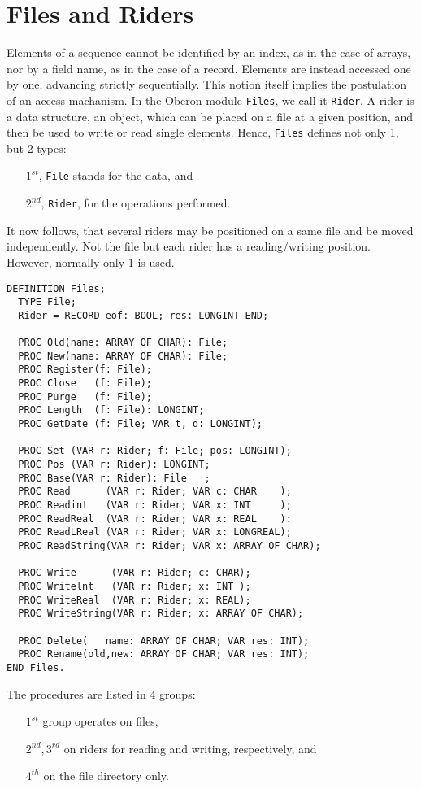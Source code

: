 \section{Files and Riders}
Elements of a sequence cannot be identified by an index, as in the case of arrays, nor by
a field name, as in the case of a record. Elements are instead accessed one by one,
advancing strictly sequentially. This notion itself implies the postulation of an access
machanism. In the Oberon module \verb|Files|, we call it \verb|Rider|. A rider is a data
structure, an object, which can be placed on a file at a given position, and then be used
to write or read single elements. Hence, \verb|Files| defines not only 1, but 2 types:
\begin{itemize}
  \item[$1^{st}$,] \verb|File| stands for the data, and
  \item[$2^{nd}$,] \verb|Rider|, for the operations performed.
\end{itemize}
It now follows, that several riders may be positioned on a same file and be moved independently.
Not the file but each rider has a reading/writing position. However, normally only 1 is used.
\begin{verbatim}
DEFINITION Files;
  TYPE File;
  Rider = RECORD eof: BOOL; res: LONGINT END;

  PROC Old(name: ARRAY OF CHAR): File;
  PROC New(name: ARRAY OF CHAR): File;
  PROC Register(f: File);
  PROC Close   (f: File);
  PROC Purge   (f: File);
  PROC Length  (f: File): LONGINT;
  PROC GetDate (f: File; VAR t, d: LONGINT);

  PROC Set (VAR r: Rider; f: File; pos: LONGINT);
  PROC Pos (VAR r: Rider): LONGINT;
  PROC Base(VAR r: Rider): File   ;
  PROC Read      (VAR r: Rider; VAR c: CHAR    );
  PROC Readint   (VAR r: Rider; VAR x: INT     );
  PROC ReadReal  (VAR r: Rider; VAR x: REAL    ):
  PROC ReadLReal (VAR r: Rider; VAR x: LONGREAL);
  PROC ReadString(VAR r: Rider; VAR x: ARRAY OF CHAR);

  PROC Write      (VAR r: Rider; c: CHAR);
  PROC Writelnt   (VAR r: Rider; x: INT );
  PROC WriteReal  (VAR r: Rider; x: REAL);
  PROC WriteString(VAR r: Rider; x: ARRAY OF CHAR);

  PROC Delete(   name: ARRAY OF CHAR; VAR res: INT);
  PROC Rename(old,new: ARRAY OF CHAR; VAR res: INT);
END Files.
\end{verbatim}
The procedures are listed in 4 groups:
\begin{itemize}
  \item[$1^{st}$] group operates on files,
  \item[$2^{nd},3^{rd}$] on riders for reading and writing, respectively, and
  \item[$4^{th}$] on the file directory only.
\end{itemize}
